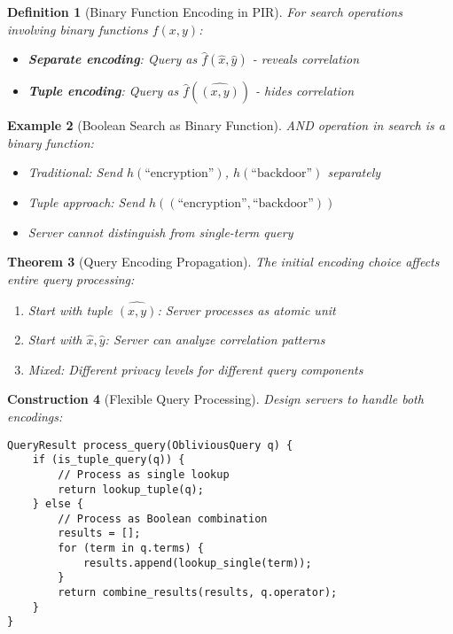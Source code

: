\documentclass[11pt,final,hidelinks]{article}
\newtheorem{theorem}{Theorem}[section]
\newtheorem{definition}[theorem]{Definition}
\newtheorem{example}[theorem]{Example}
\newtheorem{construction}[theorem]{Construction}
\begin{document}
\begin{definition}[Binary Function Encoding in PIR]
For search operations involving binary functions $f(x,y)$:
\begin{itemize}
    \item \textbf{Separate encoding}: Query as $\hat{f}(\hat{x}, \hat{y})$ - reveals correlation
    \item \textbf{Tuple encoding}: Query as $\hat{f}(\widehat{(x,y)})$ - hides correlation
\end{itemize}
\end{definition}

\begin{example}[Boolean Search as Binary Function]
AND operation in search is a binary function:
\begin{itemize}
    \item Traditional: Send $h(\text{``encryption''})$, $h(\text{``backdoor''})$ separately
    \item Tuple approach: Send $h((\text{``encryption''}, \text{``backdoor''}))$
    \item Server cannot distinguish from single-term query
\end{itemize}
\end{example}

\begin{theorem}[Query Encoding Propagation]
The initial encoding choice affects entire query processing:
\begin{enumerate}
    \item Start with tuple $\widehat{(x,y)}$: Server processes as atomic unit
    \item Start with $\hat{x}, \hat{y}$: Server can analyze correlation patterns
    \item Mixed: Different privacy levels for different query components
\end{enumerate}
\end{theorem}

\begin{construction}[Flexible Query Processing]
Design servers to handle both encodings:
\begin{verbatim}
QueryResult process_query(ObliviousQuery q) {
    if (is_tuple_query(q)) {
        // Process as single lookup
        return lookup_tuple(q);
    } else {
        // Process as Boolean combination
        results = [];
        for (term in q.terms) {
            results.append(lookup_single(term));
        }
        return combine_results(results, q.operator);
    }
}
\end{verbatim}
\end{construction}
\end{document}
